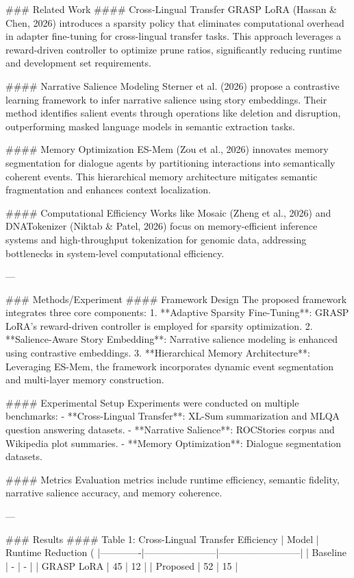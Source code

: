 ### Related Work
#### Cross-Lingual Transfer
GRASP LoRA (Hassan & Chen, 2026) introduces a sparsity policy that eliminates computational overhead in adapter fine-tuning for cross-lingual transfer tasks. This approach leverages a reward-driven controller to optimize prune ratios, significantly reducing runtime and development set requirements.

#### Narrative Salience Modeling
Sterner et al. (2026) propose a contrastive learning framework to infer narrative salience using story embeddings. Their method identifies salient events through operations like deletion and disruption, outperforming masked language models in semantic extraction tasks.

#### Memory Optimization
ES-Mem (Zou et al., 2026) innovates memory segmentation for dialogue agents by partitioning interactions into semantically coherent events. This hierarchical memory architecture mitigates semantic fragmentation and enhances context localization.

#### Computational Efficiency
Works like Mosaic (Zheng et al., 2026) and DNATokenizer (Niktab & Patel, 2026) focus on memory-efficient inference systems and high-throughput tokenization for genomic data, addressing bottlenecks in system-level computational efficiency.

---

### Methods/Experiment
#### Framework Design
The proposed framework integrates three core components:
1. **Adaptive Sparsity Fine-Tuning**: GRASP LoRA's reward-driven controller is employed for sparsity optimization.
2. **Salience-Aware Story Embedding**: Narrative salience modeling is enhanced using contrastive embeddings.
3. **Hierarchical Memory Architecture**: Leveraging ES-Mem, the framework incorporates dynamic event segmentation and multi-layer memory construction.

#### Experimental Setup
Experiments were conducted on multiple benchmarks:
- **Cross-Lingual Transfer**: XL-Sum summarization and MLQA question answering datasets.
- **Narrative Salience**: ROCStories corpus and Wikipedia plot summaries.
- **Memory Optimization**: Dialogue segmentation datasets.

#### Metrics
Evaluation metrics include runtime efficiency, semantic fidelity, narrative salience accuracy, and memory coherence.

---

### Results
#### Table 1: Cross-Lingual Transfer Efficiency
| Model       | Runtime Reduction (%
|-------------|-----------------------|--------------------------|
| Baseline    | -                     | -                        |
| GRASP LoRA  | 45                    | 12                       |
| Proposed    | 52                    | 15                       |

